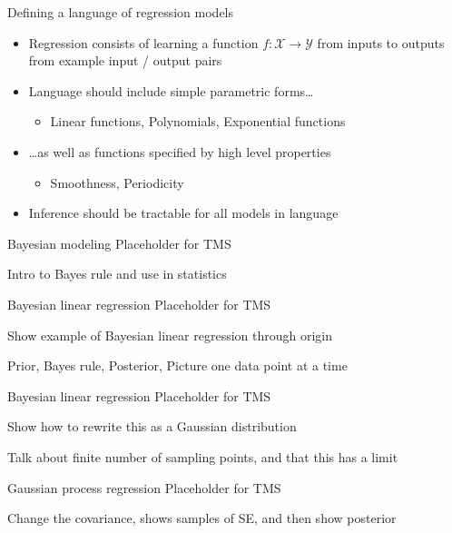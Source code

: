 \begin{frame}{Defining a language of regression models}
  \begin{itemize}
    \item Regression consists of learning a function $f: \mathcal{X} \to \mathcal{Y}$ from inputs to outputs from example input / output pairs
    \vspace{\baselineskip}
    \item Language should include simple parametric forms\ldots
    \begin{itemize}
       \item \eg Linear functions, Polynomials, Exponential functions
     \end{itemize}
    \vspace{\baselineskip}
    \item \ldots as well as functions specified by high level properties
    \begin{itemize}
       \item \eg Smoothness, Periodicity
     \end{itemize}
    \vspace{\baselineskip}
    \item Inference should be tractable for all models in language
  \end{itemize}
\end{frame}

\begin{frame}{Bayesian modeling}
  Placeholder for TMS
  
  Intro to Bayes rule and use in statistics
\end{frame}

\begin{frame}{Bayesian linear regression}
  Placeholder for TMS
  
  Show example of Bayesian linear regression through origin
  
  Prior, Bayes rule, Posterior, Picture one data point at a time
\end{frame}

\begin{frame}{Bayesian linear regression}
  Placeholder for TMS
  
  Show how to rewrite this as a Gaussian distribution
  
  Talk about finite number of sampling points, and that this has a limit
\end{frame}

\begin{frame}{Gaussian process regression}
  Placeholder for TMS
  
  Change the covariance, shows samples of SE, and then show posterior
\end{frame}


